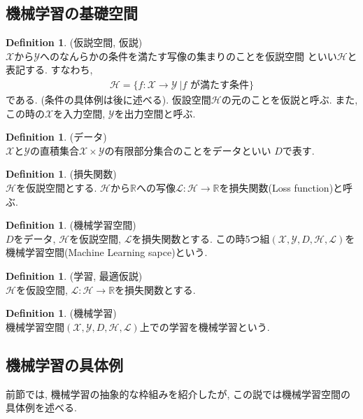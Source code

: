 \documentclass[11pt, a4paper, dvipdfmx]{jsarticle}
\theoremstyle{definition}
\newtheorem{Definition+}[Axiom+]{Definition}
\newcommand{\R}{\mathbb{R}}
\newcommand{\X}{\mathcal{X}}
\newcommand{\Y}{\mathcal{Y}}
\renewcommand{\L}{\mathcal{L}}
\newcommand{\Hil}{\mathcal{H}}
\newcommand{\MLsp}{(\X, \Y, D, \Hil, \L)}
\begin{document}
\subsection{機械学習の基礎空間}
\begin{Definition+}(仮説空間, 仮説)\\
    $\X$から$\Y$へのなんらかの条件を満たす写像の集まりのことを仮説空間
    といい$\Hil$と表記する. すなわち,
    \begin{align*}
        \Hil = \{f:\X\to\Y~| f\text{ が満たす条件}\}
    \end{align*}
    である. (条件の具体例は後に述べる). 仮設空間$\Hil$の元のことを仮説と呼ぶ.
    また, この時の$\X$を入力空間, $\Y$を出力空間と呼ぶ.
\end{Definition+}

\begin{Definition+}(データ)\\
    $\X$と$\Y$の直積集合$\X\times\Y$の有限部分集合のことをデータといい
    $D$で表す.
\end{Definition+}

\begin{Definition+}(損失関数)\\
    $\Hil$を仮説空間とする. $\Hil$から$\R$への写像$\L:\Hil\to\R$を損失関数(Loss function)と呼ぶ.
\end{Definition+}
\begin{Definition+}(機械学習空間)\\
    $D$をデータ, $\Hil$を仮説空間, $\L$を損失関数とする. この時5つ組$\MLsp$を機械学習空間(Machine Learning sapce)という.
\end{Definition+}

\begin{Definition+}(学習, 最適仮説)\\
    $\Hil$を仮設空間, $\L:\Hil\to\R$を損失関数とする. 
\end{Definition+}

\begin{Definition+}(機械学習)\\
    機械学習空間$\MLsp$上での学習を機械学習という.
\end{Definition+}

\subsection{機械学習の具体例}
前節では, 機械学習の抽象的な枠組みを紹介したが, この説では機械学習空間の具体例を述べる.
\end{document}
